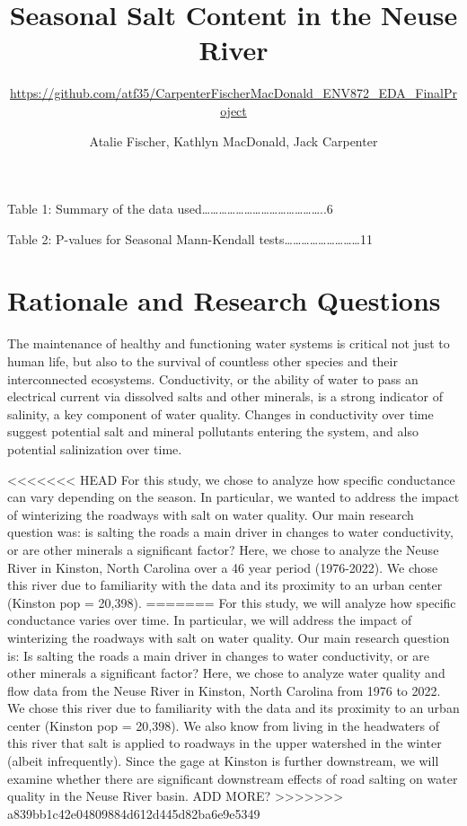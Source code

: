 \documentclass[
  12pt,
]{article}
\title{Seasonal Salt Content in the Neuse River}
\subtitle{\url{https://github.com/atf35/CarpenterFischerMacDonald_ENV872_EDA_FinalProject}}
\author{Atalie Fischer, Kathlyn MacDonald, Jack Carpenter}
\date{}
\begin{document}
\maketitle

{
\setcounter{tocdepth}{2}
\tableofcontents
}
\newpage

\listoftables

Table 1: Summary of the data
used\ldots\ldots\ldots\ldots\ldots\ldots\ldots\ldots\ldots\ldots\ldots\ldots\ldots\ldots..6

Table 2: P-values for Seasonal Mann-Kendall
tests\ldots\ldots\ldots\ldots\ldots\ldots\ldots\ldots\ldots11 \newpage

\listoffigures 
\newpage

\hypertarget{rationale-and-research-questions}{%
\section{Rationale and Research
Questions}\label{rationale-and-research-questions}}

The maintenance of healthy and functioning water systems is critical not
just to human life, but also to the survival of countless other species
and their interconnected ecosystems. Conductivity, or the ability of
water to pass an electrical current via dissolved salts and other
minerals, is a strong indicator of salinity, a key component of water
quality. Changes in conductivity over time suggest potential salt and
mineral pollutants entering the system, and also potential salinization
over time.

\textless\textless\textless\textless\textless\textless\textless{} HEAD
For this study, we chose to analyze how specific conductance can vary
depending on the season. In particular, we wanted to address the impact
of winterizing the roadways with salt on water quality. Our main
research question was: is salting the roads a main driver in changes to
water conductivity, or are other minerals a significant factor? Here, we
chose to analyze the Neuse River in Kinston, North Carolina over a 46
year period (1976-2022). We chose this river due to familiarity with the
data and its proximity to an urban center (Kinston pop = 20,398).
======= For this study, we will analyze how specific conductance varies
over time. In particular, we will address the impact of winterizing the
roadways with salt on water quality. Our main research question is: Is
salting the roads a main driver in changes to water conductivity, or are
other minerals a significant factor? Here, we chose to analyze water
quality and flow data from the Neuse River in Kinston, North Carolina
from 1976 to 2022. We chose this river due to familiarity with the data
and its proximity to an urban center (Kinston pop = 20,398). We also
know from living in the headwaters of this river that salt is applied to
roadways in the upper watershed in the winter (albeit infrequently).
Since the gage at Kinston is further downstream, we will examine whether
there are significant downstream effects of road salting on water
quality in the Neuse River basin. ADD MORE?
\textgreater\textgreater\textgreater\textgreater\textgreater\textgreater\textgreater{}
a839bb1c42e04809884d612d445d82ba6e9e5349
\end{document}
